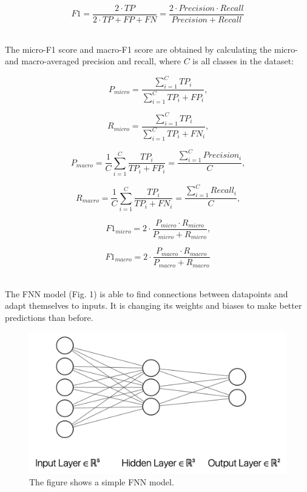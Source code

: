 \documentclass[conference]{IEEEtran}
\begin{document}
\begin{equation}
F1 = \frac{2 \cdot TP}{2 \cdot TP + FP + FN} = \frac{2 \cdot Precision \cdot Recall}{Precision + Recall}
\end{equation}
\\
\vspace{-1em}

The micro-F1 score and macro-F1 score are obtained by calculating the micro- and macro-averaged precision and recall, where $C$ is all classes in the dataset:

\begin{equation}
P_{micro} = \frac{\sum_{i=1}^C TP_{i}}{\sum^C_{i=1}TP_{i} + FP_i} \text{,}
\end{equation}

\begin{equation}
R_{micro} = \frac{\sum_{i=1}^C TP_{i}}{\sum^C_{i=1}TP_{i} + FN_i} \text{,}
\end{equation}

\begin{equation}
P_{macro} = \frac{1}C \displaystyle \sum_{i=1}^C \frac{TP_{i}}{TP_i + FP_i} = \frac{\sum_{i=1}^C Precision_i}{C} \text{,}
\end{equation}

\begin{equation}
R_{macro} = \frac{1}C \displaystyle \sum_{i=1}^C \frac{TP_{i}}{TP_i + FN_i} = \frac{\sum_{i=1}^C Recall_i}{C} \text{,}
\end{equation}

\begin{equation}
F1_{micro} = 2 \cdot \frac{P_{micro} \cdot R_{micro}} {P_{micro} + R_{micro}} \text{,}
\end{equation}

\begin{equation}
F1_{macro} = 2 \cdot \frac{P_{macro} \cdot R_{macro}} {P_{macro} + R_{macro}} 
\end{equation}
\\
\vspace{-1em}

The FNN model (Fig. 1) is able to find connections between datapoints and adapt themselves to inputs\cite{Maennel}. It is changing its weights and biases\cite{Patel} to make better predictions than before. 

 
\begin{figure}[htbp]
\centerline{\includegraphics[scale=0.26]{FNN Visualized}}
\caption{The figure shows a simple FNN model.}
\label{fig}
\end{figure}
\end{document}

